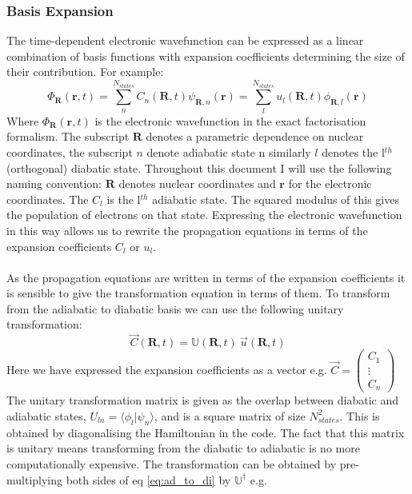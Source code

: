 \subsubsection{Basis Expansion}
The time-dependent electronic wavefunction can be expressed as a linear combination of basis functions with expansion coefficients determining the size of their contribution. For example:
\begin{equation}
  \Phi_{\textbf{R}}(\textbf{r}, t) = \sum_{n}^{N_{states}}C_{n}(\textbf{R}, t) \psi_{\textbf{R}, n}(\textbf{r}) = \sum_{l}^{N_{states}} u_{l}(\textbf{R}, t) \phi_{\textbf{R}, l}(\textbf{r})
\end{equation}
Where $\Phi_{\textbf{R}}(\textbf{r}, t)$ is the electronic wavefunction in the exact factorisation formalism. The subscript $\textbf{R}$ denotes a parametric dependence on nuclear coordinates, the subscript $n$ denote adiabatic state n similarly $l$ denotes the l$^{th}$ (orthogonal) diabatic state. Throughout this document I will use the following naming convention: $\textbf{R}$ denotes nuclear coordinates and $\textbf{r}$ for the electronic coordinates. The $C_{l}$ is the l$^{th}$ adiabatic state. The squared modulus of this gives the population of electrons on that state. Expressing the electronic wavefunction in this way allows us to rewrite the propagation equations in terms of the expansion coefficients $C_{l}$ or $u_{l}$.
\\\\
As the propagation equations are written in terms of the expansion coefficients it is sensible to give the transformation equation in terms of them. To transform from the adiabatic to diabatic basis we can use the following unitary transformation:
\begin{equation}
  \vec{C}(\textbf{R}, t) = \mathbb{U}(\textbf{R}, t) \  \vec{u}(\textbf{R}, t)
  \label{eq:ad_to_di}
\end{equation}
Here we have expressed the expansion coefficients as a vector e.g. $\vec{C} = \left( \begin{array}{c}
C_1 \\
\vdots \\
C_n
\end{array}\right)$
The unitary transformation matrix is given as the overlap between diabatic and adiabatic states, $U_{ln} = \langle \phi_{l} | \psi_{n} \rangle$, and is a square matrix of size $N_{states}^2$. This is obtained by diagonalising the Hamiltonian in the code. The fact that this matrix is unitary means transforming from the diabatic to adiabatic is no more computationally expensive. The transformation can be obtained by pre-multiplying both sides of eq \eqref{eq:ad_to_di} by $\mathbb{U}^{\dagger}$ e.g.
